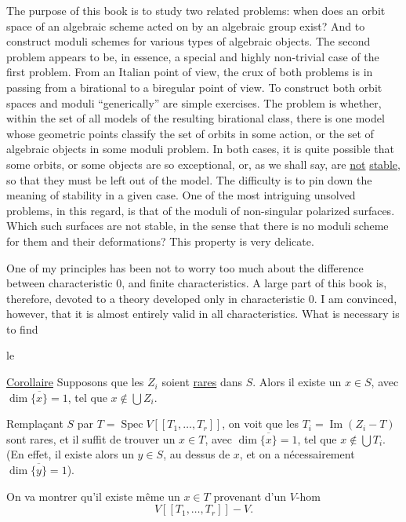 The purpose of this book is to study two related problems: when does an orbit space of an algebraic scheme acted on by an algebraic group exist? And to construct moduli schemes for various types of algebraic objects. The second problem appears to be, in essence, a special and highly non-trivial case of the first problem. From an Italian point of view, the crux of both problems is in passing from a birational to a biregular point of view. To construct both orbit spaces and moduli ``generically'' are simple exercises. The problem is whether, within the set of all models of the resulting birational class, there is one model whose geometric points classify the set of orbits in some action, or the set of algebraic objects in some moduli problem. In both cases, it is quite possible that some orbits, or some objects are so exceptional, or, as we shall say, are \uline{not} \uline{stable}, so that they must be left out of the model. The difficulty is to pin down the meaning of stability in a given case. One of the most intriguing unsolved problems, in this regard, is that of the moduli of non-singular polarized surfaces. Which such surfaces are not stable, in the sense that there is no moduli scheme for them and their deformations? This property is very delicate.

One of my principles has been not to worry too much about the difference between characteristic $0$, and finite characteristics. A large part of this book is, therefore, devoted to a theory developed only in characteristic $0$. I am convinced, however, that it is almost entirely valid in all characteristics. What is necessary is to find


le

\uline{Corollaire} Supposons que les $Z_i$ soient \uline{rares} dans $S$. Alors il existe un $x\in S$, avec $\dim\overline{\{x\}}=1$, tel que $x\notin\bigcup Z_i$.

Remplaçant $S$ par $T=\operatorname{Spec}V[[T_1,\ldots,T_r]]$,  on voit que les $T_i=\operatorname{Im}(Z_i\mathbin{-}T)$ sont rares, et il suffit de trouver un $x\in T$, avec $\dim\overline{\{x\}}=1$, tel que $x\notin\bigcup T_i$. (En effet, il existe alors un $y\in S$, au dessus de $x$, et on a nécessairement $\dim\overline{\{y\}}=1$).

On va montrer qu'il existe même un $x\in T$ provenant d'un $V$-hom
\[
V[[T_1,\ldots,T_r]]\mathbin{-}V.
\]

